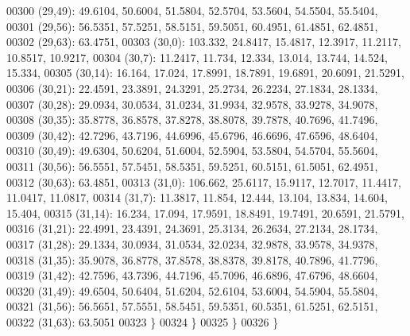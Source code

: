 \begin{DoxyCode}
00300       (29,49): 49.6104, 50.6004, 51.5804, 52.5704, 53.5604, 54.5504, 55.5404,
00301       (29,56): 56.5351, 57.5251, 58.5151, 59.5051, 60.4951, 61.4851, 62.4851,
00302       (29,63): 63.4751,
00303       (30,0): 103.332, 24.8417, 15.4817, 12.3917, 11.2117, 10.8517, 10.9217,
00304       (30,7): 11.2417, 11.734, 12.334, 13.014, 13.744, 14.524, 15.334,
00305       (30,14): 16.164, 17.024, 17.8991, 18.7891, 19.6891, 20.6091, 21.5291,
00306       (30,21): 22.4591, 23.3891, 24.3291, 25.2734, 26.2234, 27.1834, 28.1334,
00307       (30,28): 29.0934, 30.0534, 31.0234, 31.9934, 32.9578, 33.9278, 34.9078,
00308       (30,35): 35.8778, 36.8578, 37.8278, 38.8078, 39.7878, 40.7696, 41.7496,
00309       (30,42): 42.7296, 43.7196, 44.6996, 45.6796, 46.6696, 47.6596, 48.6404,
00310       (30,49): 49.6304, 50.6204, 51.6004, 52.5904, 53.5804, 54.5704, 55.5604,
00311       (30,56): 56.5551, 57.5451, 58.5351, 59.5251, 60.5151, 61.5051, 62.4951,
00312       (30,63): 63.4851,
00313       (31,0): 106.662, 25.6117, 15.9117, 12.7017, 11.4417, 11.0417, 11.0817,
00314       (31,7): 11.3817, 11.854, 12.444, 13.104, 13.834, 14.604, 15.404,
00315       (31,14): 16.234, 17.094, 17.9591, 18.8491, 19.7491, 20.6591, 21.5791,
00316       (31,21): 22.4991, 23.4391, 24.3691, 25.3134, 26.2634, 27.2134, 28.1734,
00317       (31,28): 29.1334, 30.0934, 31.0534, 32.0234, 32.9878, 33.9578, 34.9378,
00318       (31,35): 35.9078, 36.8778, 37.8578, 38.8378, 39.8178, 40.7896, 41.7796,
00319       (31,42): 42.7596, 43.7396, 44.7196, 45.7096, 46.6896, 47.6796, 48.6604,
00320       (31,49): 49.6504, 50.6404, 51.6204, 52.6104, 53.6004, 54.5904, 55.5804,
00321       (31,56): 56.5651, 57.5551, 58.5451, 59.5351, 60.5351, 61.5251, 62.5151,
00322       (31,63): 63.5051
00323       \}
00324    \}
00325 \}
00326 \}
\end{DoxyCode}
